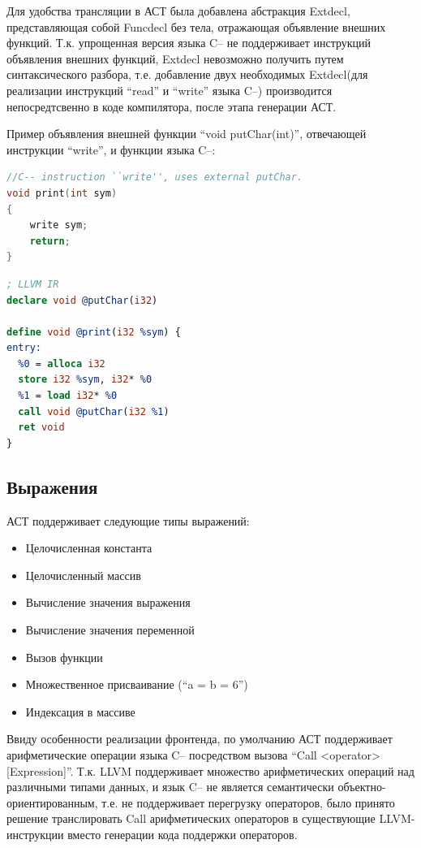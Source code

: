 \documentclass[a4paper,12pt]{report}
\numberwithin{equation}{section}
\begin{document}
Для удобства трансляции в АСТ была добавлена абстракция Extdecl, представляющая собой Funcdecl без тела, отражающая объявление внешних функций. Т.к. упрощенная версия языка C-- не поддерживает инструкций объявления внешних функций, Extdecl невозможно получить путем синтаксического разбора, т.е. добавление двух необходимых Extdecl(для реализации инструкций ``read'' и ``write'' языка C--) производится непосредтсвенно в коде компилятора, после этапа генерации АСТ.


Пример объявления внешней функции ``void putChar(int)'', отвечающей инструкции ``write'', и функции языка C--:
\begin{lstlisting}[language=C]
//C-- instruction ``write'', uses external putChar.
void print(int sym)
{
    write sym;
    return;
}
\end{lstlisting}

\begin{lstlisting}[language=llvm]
; LLVM IR
declare void @putChar(i32)

define void @print(i32 %sym) {
entry:
  %0 = alloca i32
  store i32 %sym, i32* %0
  %1 = load i32* %0
  call void @putChar(i32 %1)
  ret void
}
\end{lstlisting}

\subsection{Выражения}
АСТ поддерживает следующие типы выражений:
\begin{itemize}
  \item Целочисленная константа
  \item Целочисленный массив
  \item Вычисление значения выражения %
  \item Вычисление значения переменной
  \item Вызов функции
  \item Множественное присваивание (``a = b = 6'')
  \item Индексация в массиве
\end{itemize}
Ввиду особенности реализации фронтенда, по умолчанию АСТ поддерживает арифметические операции языка C-- посредством вызова ``Call <operator> [Expression]''. Т.к. LLVM поддерживает множество арифметических операций над различными типами данных, и язык C-- не является семантически объектно-ориентированным, т.е. не поддерживает перегрузку операторов, было принято решение транслировать Call арифметических операторов в существующие LLVM-инструкции вместо генерации кода поддержки операторов.
\end{document}
